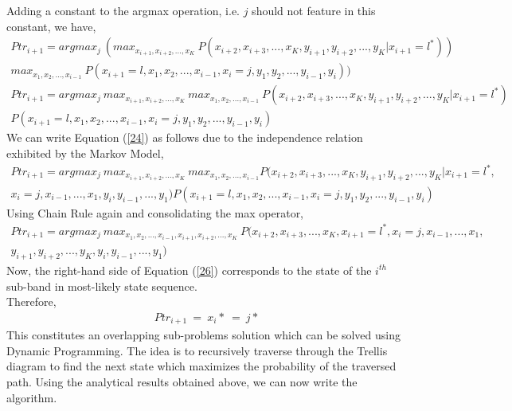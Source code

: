 \documentclass[12pt, draftcls, onecolumn]{IEEEtran}
\begin{document}
Adding a constant to the argmax operation, i.e. $j$ should not feature in this constant, we have,
\begin{equation}\label{23}
    \begin{aligned}
        Ptr_{i+1}=argmax_j\ (max_{x_{i+1},x_{i+2},...,x_K}\ P(x_{i+2},x_{i+3},...,x_K,y_{i+1},y_{i+2},...,y_{K}|x_{i+1}=l^*))\\max_{x_1,x_2,...,x_{i-1}}\ P(x_{i+1}=l,x_1,x_2,...,x_{i-1},x_{i}=j,y_1,y_2,...,y_{i-1},y_{i}))
    \end{aligned}
\end{equation}
\begin{equation}\label{24}
    \begin{aligned}
        Ptr_{i+1}=argmax_j\ max_{x_{i+1},x_{i+2},...,x_K}\ max_{x_1,x_2,...,x_{i-1}}\ P(x_{i+2},x_{i+3},...,x_K,y_{i+1},y_{i+2},...,y_{K}|x_{i+1}=l^*)\\P(x_{i+1}=l,x_1,x_2,...,x_{i-1},x_{i}=j,y_1,y_2,...,y_{i-1},y_{i})
    \end{aligned}
\end{equation}
We can write Equation (\ref{24}) as follows due to the independence relation exhibited by the Markov Model,
\begin{equation}\label{25}
    \begin{aligned}
        Ptr_{i+1}=argmax_j\ max_{x_{i+1},x_{i+2},...,x_K}\ max_{x_1,x_2,...,x_{i-1}}P(x_{i+2},x_{i+3},...,x_K,y_{i+1},y_{i+2},...,y_{K}|x_{i+1}=l^*,\\x_{i}=j,x_{i-1},...,x_1,y_{i},y_{i-1},...,y_1)P(x_{i+1}=l,x_1,x_2,...,x_{i-1},x_{i}=j,y_1,y_2,...,y_{i-1},y_{i})
    \end{aligned}
\end{equation}
Using Chain Rule again and consolidating the max operator,
\begin{equation}\label{26}
    \begin{aligned}
        Ptr_{i+1}=argmax_j\ max_{x_1,x_2,...,x_{i-1},x_{i+1},x_{i+2},...,x_K}\ P(x_{i+2},x_{i+3},...,x_K,x_{i+1}=l^*,x_{i}=j,x_{i-1},...,x_1,\\y_{i+1},y_{i+2},...,y_{K},y_{i},y_{i-1},...,y_1)
    \end{aligned}
\end{equation}
Now, the right-hand side of Equation (\ref{26}) corresponds to the state of the $i^{th}$ sub-band in most-likely state sequence.
\\Therefore,
\begin{equation}\label{27}
    \begin{aligned}
        Ptr_{i+1}\ =\ x_i*\ =\ j*
    \end{aligned}
\end{equation}
This constitutes an overlapping sub-problems solution which can be solved using Dynamic Programming. The idea is to recursively traverse through the Trellis diagram to find the next state which maximizes the probability of the traversed path. Using the analytical results obtained above, we can now write the algorithm.
\end{document}
